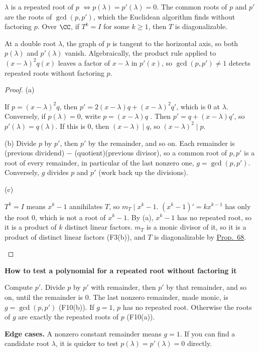 \documentclass[10pt]{scrartcl}
\newenvironment{methodbox}[1]{\begin{mdframed}[style=mdbluebox,linecolor=NavyBlue,backgroundcolor=NavyBlue!3]\textbf{\color{NavyBlue}#1}\par\vspace{2pt}}{\end{mdframed}}
\begin{document}
\begin{proposition*}\hypertarget{name-f10-repeated-roots-ex-59}{}\label{name-f10-repeated-roots-ex-59}
  \begin{enumerate}[(a)]
    \ii $\lambda$ is a repeated root of $p$ $\iff p(\lambda)=p'(\lambda)=0$.
    \ii The common roots of $p$ and $p'$ are the roots of $\gcd(p,p')$, which the Euclidean algorithm finds without factoring $p$.
    \ii Over $\CC$, if $T^k=I$ for some $k\ge1$, then $T$ is diagonalizable.
  \end{enumerate}
\end{proposition*}
\begin{ideabox}
At a double root $\lambda$, the graph of $p$ is tangent to the horizontal axis, so both $p(\lambda)$ and $p'(\lambda)$ vanish. Algebraically, the product rule applied to $(x-\lambda)^2q(x)$ leaves a factor of $x-\lambda$ in $p'(x)$, so $\gcd(p,p')\ne 1$ detects repeated roots without factoring $p$.
\end{ideabox}
\begin{proof}
  (a)
  \begin{steps}
    \ii If $p=(x-\lambda)^2q$, then $p'=2(x-\lambda)q+(x-\lambda)^2q'$, which is $0$ at $\lambda$.
    \ii Conversely, if $p(\lambda)=0$, write $p=(x-\lambda)q$ . Then $p'=q+(x-\lambda)q'$, so $p'(\lambda)=q(\lambda)$. If this is $0$, then $(x-\lambda)\mid q$, so $(x-\lambda)^2\mid p$.
  \end{steps}
  (b) Divide $p$ by $p'$, then $p'$ by the remainder, and so on. Each remainder is (previous dividend) $-$ (quotient)(previous divisor), so a common root of $p,p'$ is a root of every remainder, in particular of the last nonzero one, $g=\gcd(p,p')$. Conversely, $g$ divides $p$ and $p'$ (work back up the divisions).

  (c)
  \begin{steps}
    \ii $T^k=I$ means $x^k-1$ annihilates $T$, so $m_T\mid x^k-1$.
    \ii $(x^k-1)'=kx^{k-1}$ has only the root $0$, which is not a root of $x^k-1$. By (a), $x^k-1$ has no repeated root, so it is a product of $k$ distinct linear factors.
    \ii $m_T$ is a monic divisor of it, so it is a product of distinct linear factors (F3(b)), and $T$ is diagonalizable by \hyperref[prop-68]{Prop.~68}.
  \end{steps}
\end{proof}

\begin{methodbox}{How to test a polynomial for a repeated root without factoring it}
\begin{enumerate}[label=\arabic*.,leftmargin=1.5em,itemsep=2pt,topsep=2pt]
  \ii Compute $p'$.
  \ii Divide $p$ by $p'$ with remainder, then $p'$ by that remainder, and so on, until the remainder is $0$. The last nonzero remainder, made monic, is $g=\gcd(p,p')$ (F10(b)).
  \ii If $g=1$, $p$ has no repeated root. Otherwise the roots of $g$ are exactly the repeated roots of $p$ (F10(a)).
\end{enumerate}
\textbf{Edge cases.} A nonzero constant remainder means $g=1$. If you can find a candidate root $\lambda$, it is quicker to test $p(\lambda)=p'(\lambda)=0$ directly.
\end{methodbox}
\end{document}
